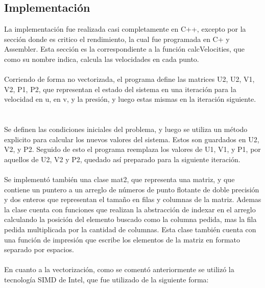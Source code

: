 \subsection{Implementación}
La implementación fue realizada casi completamente en C++, excepto por la sección donde es critico el rendimiento, la cual fue programada en C+ y Assembler. Esta sección es la correspondiente a la función calcVelocities, que como su nombre indica, calcula las velocidades en cada punto.
~\\
~\\
Corriendo de forma no vectorizada, el programa define las matrices U2, U2, V1, V2, P1, P2, que representan el estado del sistema en una iteración para la velocidad en u, en v, y la presión, y luego estas mismas en la iteración siguiente. 
~\\
~\\
Se definen las condiciones iniciales del problema, y luego se utiliza un método explicito para calcular los nuevos valores del sistema. Estos son guardados en U2, V2, y P2. Seguido de esto el programa reemplaza los valores de U1, V1, y P1, por aquellos de U2, V2 y P2, quedado así preparado para la siguiente iteración. 
~\\
~\\
Se implementó también una clase mat2, que representa una matriz, y que contiene un puntero a un arreglo de números de punto flotante de doble precisión y dos enteros que representan el tamaño en filas y columnas de la matriz. Ademas la clase cuenta con funciones que realizan la abstracción de indexar en el arreglo calculando la posición del elemento buscado como la columna pedida, mas la fila pedida multiplicada por la cantidad de columnas. Esta clase también cuenta con una función de impresión que escribe los elementos de la matriz en formato separado por espacios.
~\\
~\\
En cuanto a la vectorización, como se comentó anteriormente se utilizó la tecnología SIMD de Intel, que fue utilizado de la siguiente forma:
